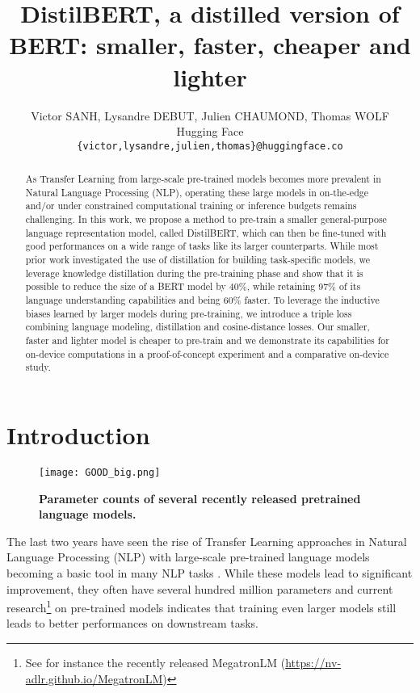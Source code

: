 \documentclass{article}
\title{DistilBERT, a distilled version of BERT: smaller, faster, cheaper and lighter}
\author{Victor SANH, Lysandre DEBUT, Julien CHAUMOND, Thomas WOLF\\
  Hugging Face\\
  \texttt{\{victor,lysandre,julien,thomas\}@huggingface.co}
}
\begin{document}
\maketitle

\begin{abstract}
    As Transfer Learning from large-scale pre-trained models becomes more prevalent in Natural Language Processing (NLP), operating these large models in on-the-edge and/or under constrained computational training or inference budgets remains challenging. In this work, we propose a method to pre-train a smaller general-purpose language representation model, called DistilBERT, which can then be fine-tuned with good performances on a wide range of tasks like its larger counterparts. While most prior work investigated the use of distillation for building task-specific models, we leverage knowledge distillation during the pre-training phase and show that it is possible to reduce the size of a BERT model by 40\%, while retaining 97\% of its language understanding capabilities and being 60\% faster. To leverage the inductive biases learned by larger models during pre-training, we introduce a triple loss combining language modeling, distillation and cosine-distance losses. Our smaller, faster and lighter model is cheaper to pre-train and we demonstrate its capabilities for on-device computations in a proof-of-concept experiment and a comparative on-device study.
\end{abstract}


\section{Introduction}

\begin{wrapfigure}{r}{0.61\textwidth}
  \vspace{-15pt}
  \begin{center}
    \texttt{[image: GOOD\_big.png]}
  \end{center}
  \vspace{-10pt}
  \caption{\textbf{Parameter counts of several recently released pretrained language models.}}
  \vspace{-10pt}
\end{wrapfigure}

The last two years have seen the rise of Transfer Learning approaches in Natural Language Processing (NLP) with large-scale pre-trained language models becoming a basic tool in many NLP tasks \citep{Devlin2018BERTPO, Radford2019LanguageMA, Liu2019RoBERTaAR}. While these models lead to significant improvement, they often have several hundred million parameters and current research\footnote{See for instance the recently released MegatronLM (\url{https://nv-adlr.github.io/MegatronLM})} on pre-trained models indicates that training even larger models still leads to better performances on downstream tasks.
\end{document}
